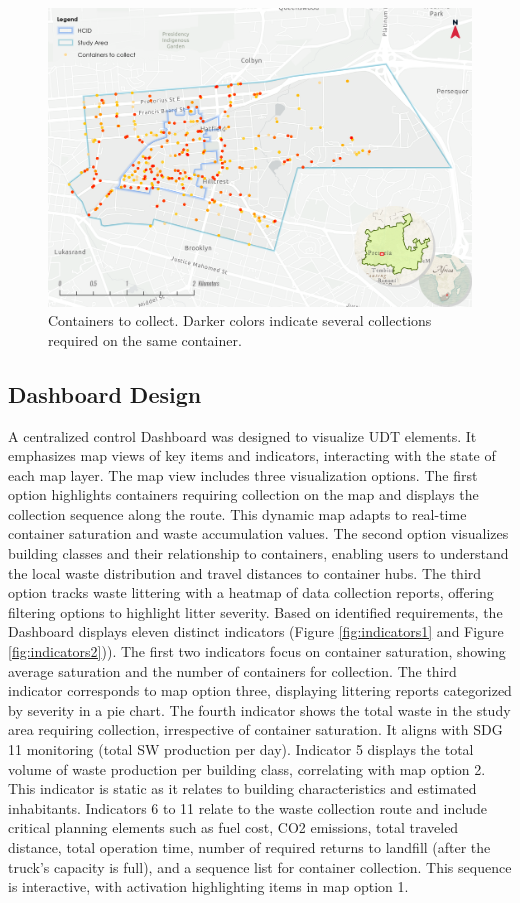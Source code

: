 \documentclass[authoryear,preprint,review,doubleblind, 12pt]{elsarticle}
\begin{document}
    \begin{figure}[h!]
    \centering
        \includegraphics[width=0.8\linewidth]{Figures/Collected containers.png}
        \caption{Containers to collect. Darker colors indicate several collections required on the same container.}
        \label{fig:road6}
    \end{figure}

    \subsection{Dashboard Design} \label{subsec:Dashboard}

    A centralized control Dashboard was designed to visualize UDT elements. It emphasizes map views of key items and indicators, interacting with the state of each map layer. The map view includes three visualization options. The first option highlights containers requiring collection on the map and displays the collection sequence along the route. This dynamic map adapts to real-time container saturation and waste accumulation values. The second option visualizes building classes and their relationship to containers, enabling users to understand the local waste distribution and travel distances to container hubs. The third option tracks waste littering with a heatmap of data collection reports, offering filtering options to highlight litter severity. 
    Based on identified requirements, the Dashboard displays eleven distinct indicators (Figure \ref{fig:indicators1} and Figure \ref{fig:indicators2})). The first two indicators focus on container saturation, showing average saturation and the number of containers for collection. The third indicator corresponds to map option three, displaying littering reports categorized by severity in a pie chart. The fourth indicator shows the total waste in the study area requiring collection, irrespective of container saturation. It aligns with SDG 11 monitoring (total SW production per day). Indicator 5 displays the total volume of waste production per building class, correlating with map option 2. This indicator is static as it relates to building characteristics and estimated inhabitants. Indicators 6 to 11 relate to the waste collection route and include critical planning elements such as fuel cost, CO2 emissions, total traveled distance, total operation time, number of required returns to landfill (after the truck's capacity is full), and a sequence list for container collection. This sequence is interactive, with activation highlighting items in map option 1.
\end{document}
